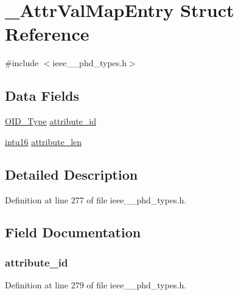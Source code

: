 \hypertarget{struct___attr_val_map_entry}{}\section{\+\_\+\+Attr\+Val\+Map\+Entry Struct Reference}
\label{struct___attr_val_map_entry}


{\ttfamily \#include $<$ieee\+\_\+\_\+phd\+\_\+types.\+h$>$}

\subsection*{Data Fields}
\begin{DoxyCompactItemize}
\item 
\hyperlink{ieee__11073__phd__types_8h_aa4d7af235d4a95d6632aa0d64160dd62}{O\+I\+D\+\_\+\+Type} \hyperlink{struct___attr_val_map_entry_a13d36b15a15c3bcd026b413fe807d3cc}{attribute\+\_\+id}
\item 
\hyperlink{ieee__11073__phd__types_8h_a3561595d2aa7416532e1c9910abd076d}{intu16} \hyperlink{struct___attr_val_map_entry_a08b3ce23acfe6026cdab5b713cc71105}{attribute\+\_\+len}
\end{DoxyCompactItemize}


\subsection{Detailed Description}


Definition at line 277 of file ieee\+\_\+\_\+phd\+\_\+types.\+h.



\subsection{Field Documentation}
\hypertarget{struct___attr_val_map_entry_a13d36b15a15c3bcd026b413fe807d3cc}{}
\subsubsection[{attribute\+\_\+id}]{ attribute\+\_\+id}\label{struct___attr_val_map_entry_a13d36b15a15c3bcd026b413fe807d3cc}


Definition at line 279 of file ieee\+\_\+\_\+phd\+\_\+types.\+h.

